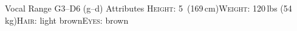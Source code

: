 \begin{cvskills}
  \cvskill
    {Vocal Range}%
    {G3--D6 (g--d\textquotesingle\textquotesingle\textquotesingle)}%
  \cvskill
    {Attributes}%
    {{\scshape Height}: 5\textquotesingle\textquotesingle ~(169\,cm){\enskip\cdotp\enskip}{\scshape Weight}: 120\,lbs (54\,kg){\enskip\cdotp\enskip}{\scshape Hair}: light brown{\enskip\cdotp\enskip}{\scshape Eyes}: brown}%
\end{cvskills}
